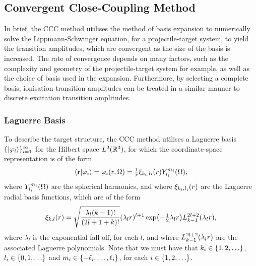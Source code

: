 \documentclass[draft]{article}
\begin{document}
\subsection{Convergent Close-Coupling Method}
\label{sec:ccc-method}

In brief, the CCC method utilises the method of basis expansion to numerically
solve the Lippmann-Schwinger equation, for a projectile-target system, to yield
the transition amplitudes, which are convergent as the size of the basis is
increased.
The rate of convergence depends on many factors, such as the complexity and
geometry of the projectile-target system for example, as well as the choice of
basis used in the expansion.
Furthermore, by selecting a complete basis, ionisation transition amplitudes can
be treated in a similar manner to discrete excitation transition amplitudes.

\subsubsection{Laguerre Basis}
\label{sec:laguerre-basis}

To describe the target structure, the CCC method utilises a Laguerre basis
$\lbrace\ket{\varphi_{i}}\rbrace_{i = 1}^{\infty}$ for the Hilbert space
$L^{2}(\mathbb{R}^{3})$, for which the coordinate-space representation is of the
form
\begin{equation}
  \label{eq:laguerre-basis}
  \bra{\vb{r}}
  \ket{\varphi_{i}}
  =
  \varphi_{i}(r, \Omega)
  =
  \tfrac{1}{r}
  \xi_{k_{i}, l{i}}(r)
  Y_{l_{i}}^{m_{i}}(\Omega)
  ,
\end{equation}
where $Y_{l_{i}}^{m_{i}}(\Omega)$ are the spherical harmonics, and where
$\xi_{k_{i}, l_{i}}(r)$ are the Laguerre radial basis functions, which are of
the form
\begin{equation}
  \label{eq:laguerre-radial-basis}
  \xi_{k, l}\lr{r}
  =
  \sqrt
  {
    \dfrac
    {
      \lambda_{l}
      \lr{k - 1}!
    }
    {
      \lr{2l + 1 + k}!
    }
  }
  \lr{\lambda_{l} r}^{l + 1}
  \exponential\lr[\big]{- \tfrac{1}{2} \lambda_{l} r}
  L_{k - 1}^{2l + 2}\lr{\lambda_{l} r}
  ,
\end{equation}
where $\lambda_{l}$ is the exponential fall-off, for each $l$, and where
$L_{k - 1}^{2l + 2}(\lambda_{l} r)$ are the associated Laguerre polynomials.
Note that we must have that
$k_{i} \in \lrset{1, 2, \dotsc}$,
$l_{i} \in \lrset{0, 1, \dotsc}$ and
$m_{i} \in \lbrace-\ell_{i}, \dotsc, \ell_{i}\rbrace$, for each
$i \in \lrset{1, 2, \dotsc}$.
\end{document}
